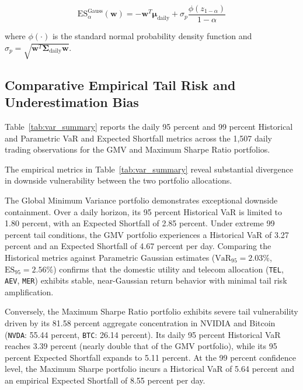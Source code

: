 \begin{equation}
  \text{ES}_\alpha^{\text{Gauss}}(\mathbf{w}) = -\mathbf{w}^T \boldsymbol{\mu}_{\text{daily}} + \sigma_p \frac{\phi(z_{1-\alpha})}{1 - \alpha}
\end{equation}

where $\phi(\cdot)$ is the standard normal probability density function and $\sigma_p = \sqrt{\mathbf{w}^T \boldsymbol{\Sigma}_{\text{daily}} \mathbf{w}}$.

\subsection{Comparative Empirical Tail Risk and Underestimation Bias}

Table~\ref{tab:var_summary} reports the daily 95 percent and 99 percent Historical and Parametric VaR and Expected Shortfall metrics across the 1,507 daily trading observations for the GMV and Maximum Sharpe Ratio portfolios.



The empirical metrics in Table~\ref{tab:var_summary} reveal substantial divergence in downside vulnerability between the two portfolio allocations.

The Global Minimum Variance portfolio demonstrates exceptional downside containment. Over a daily horizon, its 95 percent Historical VaR is limited to 1.80 percent, with an Expected Shortfall of 2.85 percent. Under extreme 99 percent tail conditions, the GMV portfolio experiences a Historical VaR of 3.27 percent and an Expected Shortfall of 4.67 percent per day. Comparing the Historical metrics against Parametric Gaussian estimates ($\text{VaR}_{95} = 2.03\%$, $\text{ES}_{95} = 2.56\%$) confirms that the domestic utility and telecom allocation (\texttt{TEL}, \texttt{AEV}, \texttt{MER}) exhibits stable, near-Gaussian return behavior with minimal tail risk amplification.

Conversely, the Maximum Sharpe Ratio portfolio exhibits severe tail vulnerability driven by its 81.58 percent aggregate concentration in NVIDIA and Bitcoin (\texttt{NVDA}: 55.44 percent, \texttt{BTC}: 26.14 percent). Its daily 95 percent Historical VaR reaches 3.39 percent (nearly double that of the GMV portfolio), while its 95 percent Expected Shortfall expands to 5.11 percent. At the 99 percent confidence level, the Maximum Sharpe portfolio incurs a Historical VaR of 5.64 percent and an empirical Expected Shortfall of 8.55 percent per day.

